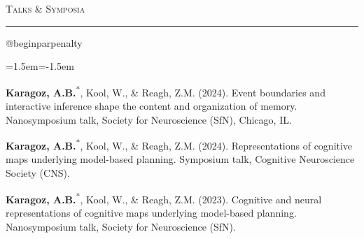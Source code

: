 \documentclass[11pt,letterpaper]{article}
\makeatletter
\newif\ifcvafterhead
\newcommand{\cvsection}[1]{%
  \par\vspace{10pt}%
  {\scshape #1}\par\nopagebreak\vspace{-6pt}%
  \noindent\rule{\textwidth}{0.4pt}\par\nopagebreak\vspace{6pt}%
  \global\cvafterheadtrue}
\newenvironment{cvrefs}
  {\csname @beginparpenalty\endcsname=10000 
   \begin{list}{}{\leftmargin=1.5em\itemindent=-1.5em\itemsep=5pt\topsep=0pt\parsep=0pt}}
  {\end{list}\vspace{2pt}}
\newcommand{\me}{\textbf{Karagoz, A.B.}}
\newcommand{\pres}{\textsuperscript{*}}    %
\makeatother
\begin{document}
\cvsection{Talks \& Symposia}
\begin{cvrefs}
\item \me\pres, Kool, W., \& Reagh, Z.M. (2024). Event boundaries and interactive inference shape
  the content and organization of memory. Nanosymposium talk, Society for Neuroscience (SfN),
  Chicago, IL.
\item \me\pres, Kool, W., \& Reagh, Z.M. (2024). Representations of cognitive maps underlying
  model-based planning. Symposium talk, Cognitive Neuroscience Society (CNS).
\item \me\pres, Kool, W., \& Reagh, Z.M. (2023). Cognitive and neural representations of cognitive
  maps underlying model-based planning. Nanosymposium talk, Society for Neuroscience (SfN).
\end{cvrefs}
\end{document}
